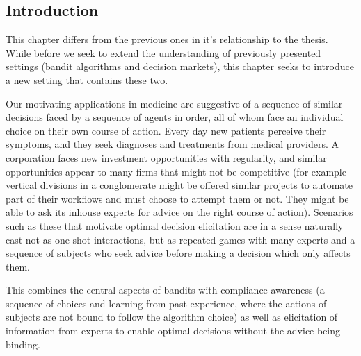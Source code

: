 
\subsection{Introduction}

This chapter differs from the previous ones in it's relationship to the thesis. 
While before we seek to extend the understanding of previously presented settings (bandit algorithms and decision markets), this chapter seeks to introduce a new setting that contains these two.



Our motivating applications in medicine are suggestive of a sequence of similar decisions faced by a sequence of agents in order, all of whom face an individual choice on their own course of action.
Every day new patients perceive their symptoms, and they seek diagnoses and treatments from medical providers. 
A corporation faces new investment opportunities with regularity, and similar opportunities appear to many firms that might not be competitive (for example vertical divisions in a conglomerate might be offered similar projects to automate part of their workflows and must choose to attempt them or not. They might be able to ask its inhouse experts for advice on the right course of action).
Scenarios such as these that motivate optimal decision elicitation are in a sense naturally cast not as one-shot interactions, but as repeated games with many experts and a sequence of subjects who seek advice before making a decision which only affects them.

This combines the central aspects of bandits with compliance awareness (a sequence of choices and learning from past experience, where the actions of subjects are not bound to follow the algorithm choice) as well as elicitation of information from experts to enable optimal decisions without the advice being binding. 



